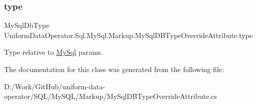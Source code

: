\subsubsection{\texorpdfstring{type}{type}}
{\footnotesize\ttfamily My\+Sql\+Db\+Type Uniform\+Data\+Operator.\+Sql.\+My\+Sql.\+Markup.\+My\+Sql\+D\+B\+Type\+Override\+Attribute.\+type}



Type relative to \mbox{\hyperlink{namespace_uniform_data_operator_1_1_sql_1_1_my_sql}{My\+Sql}} params. 



The documentation for this class was generated from the following file\+:\begin{DoxyCompactItemize}
\item 
D\+:/\+Work/\+Git\+Hub/uniform-\/data-\/operator/\+S\+Q\+L/\+My\+S\+Q\+L/\+Markup/My\+Sql\+D\+B\+Type\+Override\+Attribute.\+cs\end{DoxyCompactItemize}
